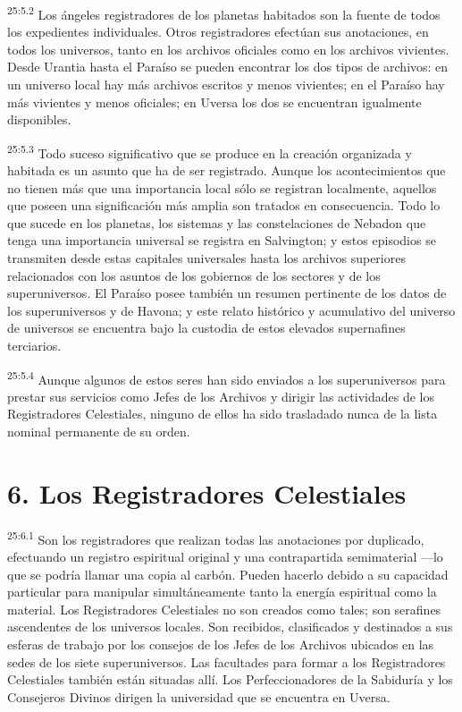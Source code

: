 \par
\textsuperscript{25:5.2} Los ángeles registradores de los planetas habitados son la fuente de todos los expedientes individuales. Otros registradores efectúan sus anotaciones, en todos los universos, tanto en los archivos oficiales como en los archivos vivientes. Desde Urantia hasta el Paraíso se pueden encontrar los dos tipos de archivos: en un universo local hay más archivos escritos y menos vivientes; en el Paraíso hay más vivientes y menos oficiales; en Uversa los dos se encuentran igualmente disponibles.

\par
\textsuperscript{25:5.3} Todo suceso significativo que se produce en la creación organizada y habitada es un asunto que ha de ser registrado. Aunque los acontecimientos que no tienen más que una importancia local sólo se registran localmente, aquellos que poseen una significación más amplia son tratados en consecuencia. Todo lo que sucede en los planetas, los sistemas y las constelaciones de Nebadon que tenga una importancia universal se registra en Salvington; y estos episodios se transmiten desde estas capitales universales hasta los archivos superiores relacionados con los asuntos de los gobiernos de los sectores y de los superuniversos. El Paraíso posee también un resumen pertinente de los datos de los superuniversos y de Havona; y este relato histórico y acumulativo del universo de universos se encuentra bajo la custodia de estos elevados supernafines terciarios.

\par
\textsuperscript{25:5.4} Aunque algunos de estos seres han sido enviados a los superuniversos para prestar sus servicios como Jefes de los Archivos y dirigir las actividades de los Registradores Celestiales, ninguno de ellos ha sido trasladado nunca de la lista nominal permanente de su orden.

\section*{6. Los Registradores Celestiales}
\par
\textsuperscript{25:6.1} Son los registradores que realizan todas las anotaciones por duplicado, efectuando un registro espiritual original y una contrapartida semimaterial ---lo que se podría llamar una copia al carbón. Pueden hacerlo debido a su capacidad particular para manipular simultáneamente tanto la energía espiritual como la material. Los Registradores Celestiales no son creados como tales; son serafines ascendentes de los universos locales. Son recibidos, clasificados y destinados a sus esferas de trabajo por los consejos de los Jefes de los Archivos ubicados en las sedes de los siete superuniversos. Las facultades para formar a los Registradores Celestiales también están situadas allí. Los Perfeccionadores de la Sabiduría y los Consejeros Divinos dirigen la universidad que se encuentra en Uversa.

